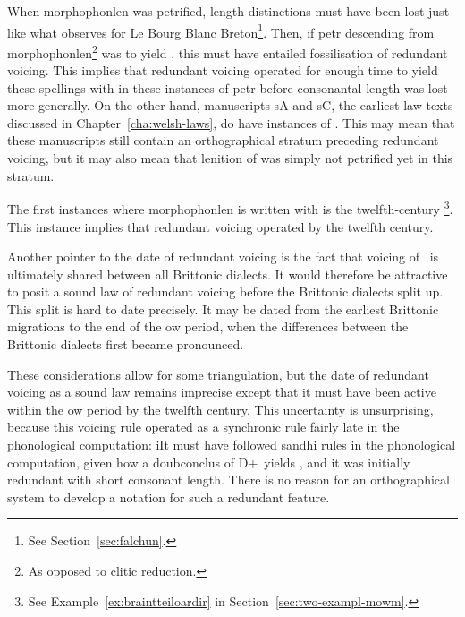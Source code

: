 When \gls{morphophonlen} was petrified, length distinctions must have been lost just like what \textcite{falchun_systeme_1951} observes for Le Bourg Blanc Breton\footnote{See Section~\ref{sec:falchun}.}. Then, if \gls{petr} descending from \gls{morphophonlen}\footnote{As opposed to clitic reduction.} was to yield , this must have entailed fossilisation of redundant voicing. This implies that redundant voicing operated for enough time to yield these spellings with  in these instances of \gls{petr} before consonantal length was lost more generally. On the other hand, manuscripts \gls{sA} and \gls{sC}, the earliest law texts discussed in Chapter~\ref{cha:welsh-laws}, do have instances of . This may mean that these manuscripts still contain an orthographical stratum preceding redundant voicing, but it may also mean that lenition of  was simply not petrified yet in this stratum.

The first instances where \gls{morphophonlen} is written with  is the twelfth-century \footnote{See Example~\ref{ex:braintteiloardir} in Section~\ref{sec:two-exampl-mowm}.}. This instance implies that redundant voicing operated by the twelfth century.  

Another pointer to the date of redundant voicing is the fact that voicing of \lT\ is ultimately shared between all Brittonic dialects. It would therefore be attractive to posit a sound law of redundant voicing before the Brittonic dialects split up. This split is hard to date precisely. It may be dated from the earliest Brittonic migrations to the end of the \gls{ow} period, when the differences between the Brittonic dialects first became pronounced.

These considerations allow for some triangulation, but the date of redundant voicing as a sound law remains imprecise except that it must have been active within the \gls{ow} period  by the twelfth century. This uncertainty is  unsurprising, because this voicing rule operated as a synchronic rule fairly late in the phonological computation: iIt must have followed sandhi rules in the phonological computation, given how a \gls{doubconclus} of \gls{D}+\lT\ yields \xT, and it was initially redundant with short consonant length. There is no reason for an orthographical system to develop a notation for such a redundant feature.


